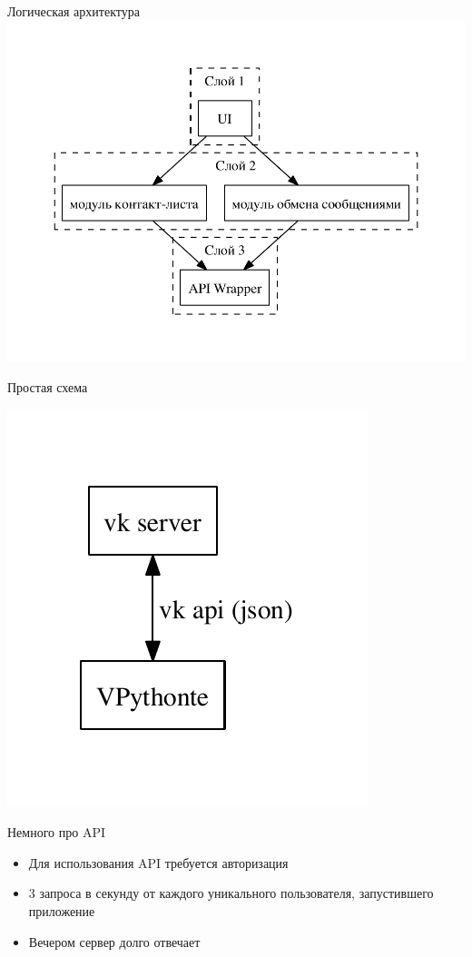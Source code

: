 \documentclass{beamer}
\begin{document}
\begin{frame}{Логическая архитектура}
\includegraphics[width=\textwidth]{./pics/logic.pdf}
\end{frame}

\begin{frame}{Простая схема}
\begin{center}
\includegraphics{./pics/simple.pdf}
\end{center}
\end{frame}

\begin{frame}{Немного про API}
\begin{itemize}
\item<1-> Для использования API требуется авторизация
\item<2-> 3 запроса в секунду от каждого уникального пользователя, запустившего приложение
\item<3-> Вечером сервер долго отвечает
\end{itemize}
\end{frame}
\end{document}
